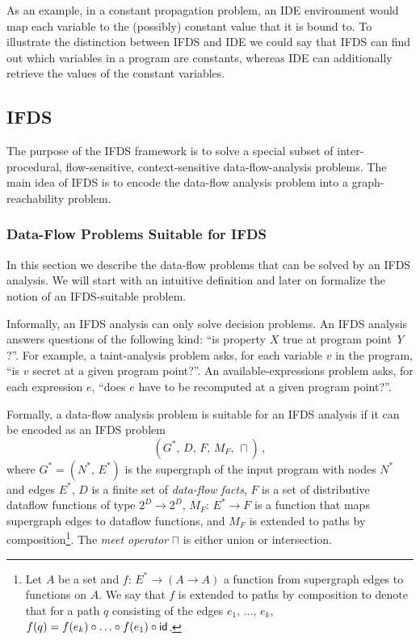 As an example, in a constant propagation problem, an IDE environment would map each variable to the (possibly) constant value that it is bound to. To illustrate the distinction between IFDS and IDE we could say that IFDS can find out which variables in a program are constants, whereas IDE can additionally retrieve the values of the constant variables.

\subsection{IFDS}\label{sec:bgifds}
The purpose of the IFDS framework is to solve a special subset of inter-procedural, flow-sensitive, context-sensitive data-flow-analysis problems. The main idea of IFDS is to encode the data-flow analysis problem into a graph-reachability problem.

\subsubsection{Data-Flow Problems Suitable for IFDS}\label{sec:suitableifds}
In this section we describe the data-flow problems that can be solved by an IFDS analysis. We will start with an intuitive definition and later on formalize the notion of an IFDS-suitable problem.

Informally, an IFDS analysis can only solve decision problems. An IFDS analysis answers questions of the following kind: ``is property $X$ true at program point~$Y$?''. For example, a taint-analysis problem asks, for each variable $v$ in the program, ``is $v$ secret at a given program point?''. 
An available-expressions problem asks, for each expression $e$, ``does $e$ have to be recomputed at a given program point?''.

Formally, a data-flow analysis problem is suitable for an IFDS analysis if it can be encoded as an IFDS problem
\begin{equation}
  (G^*,\,D,\,F,\,M_F,\,\sqcap)\,,
\end{equation} where $G^*=(N^*,\,E^*)$ is the supergraph of the input program with nodes $N^*$ and edges $E^*$, $D$ is a finite set of \textit{data-flow facts}, $F$ is a set of distributive dataflow functions of type $2^D\to2^D$, $M_F:\,E^*\to F$ is a function that maps supergraph edges to dataflow functions, and $M_F$ is extended to paths by composition\footnote{%
  Let $A$ be a set and $f:\,E^*\to(A\to A)$ a function from supergraph edges to functions on $A$.
  We say that $f$ is extended to  paths by composition to denote that for a path $q$ consisting of the edges $e_1,\,\dots,\,e_k$, $f(q)=f(e_k)\circ\ldots\circ f(e_1)\circ\textsf{id}$.
}. The \textit{meet operator} $\sqcap$ is either union or intersection.

